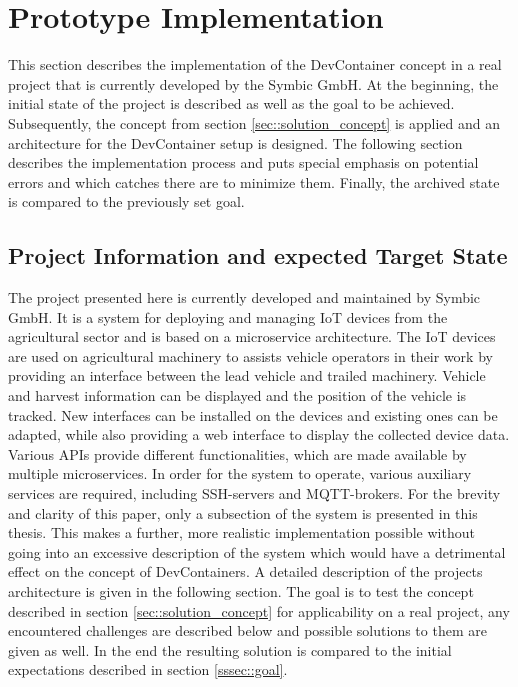 
\section{Prototype Implementation}\label{sec::solution_code}
This section describes the implementation of the DevContainer concept in a real project that is currently developed by the Symbic GmbH. At the beginning, the initial state of the project is described as well as the goal to be achieved. Subsequently, the concept from section \ref{sec::solution_concept} is applied and an architecture for the DevContainer setup is designed. The following section describes the implementation process and puts special emphasis on potential errors and which catches there are to minimize them. Finally, the archived state is compared to the previously set goal.

    \subsection{Project Information and expected Target State}
    The project presented here is currently developed and maintained by Symbic GmbH. It is a system for deploying and managing \ac{IoT} devices from the agricultural sector and is based on a microservice architecture. The \ac{IoT} devices are used on agricultural machinery to assists vehicle operators in their work by providing an interface between the lead vehicle and trailed machinery. Vehicle and harvest information can be displayed and the position of the vehicle is tracked. New interfaces can be installed on the devices and existing ones can be adapted, while also providing a web interface to display the collected device data. Various \ac{API}s provide different functionalities, which are made available by multiple microservices. In order for the system to operate, various auxiliary services are required, including \ac{SSH}-servers and MQTT-brokers. For the brevity and clarity of this paper, only a subsection of the system is presented in this thesis. This makes a further, more realistic implementation possible without going into an excessive description of the system which would have a detrimental effect on the concept of DevContainers. A detailed description of the projects architecture is given in the following section. \newline
    The goal is to test the concept described in section \ref{sec::solution_concept} for applicability on a real project, any encountered challenges are described below and possible solutions to them are given as well. In the end the resulting solution is compared to the initial expectations described in section \ref{sssec::goal}.

